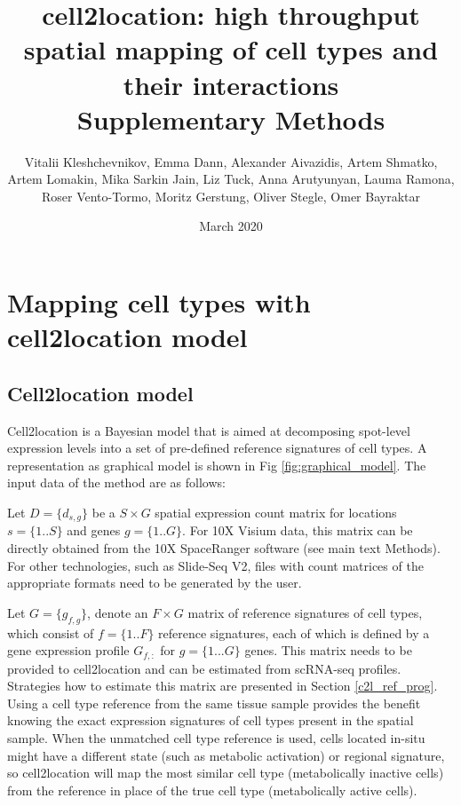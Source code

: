 \documentclass[11pt,a4paper]{article}
\title{cell2location: high throughput spatial mapping of cell types and their interactions \\
Supplementary Methods
}
\author{Vitalii Kleshchevnikov, Emma Dann, Alexander Aivazidis, Artem Shmatko, Artem Lomakin, Mika Sarkin Jain, Liz Tuck, Anna Arutyunyan, Lauma Ramona, Roser Vento-Tormo, Moritz Gerstung, Oliver Stegle, Omer Bayraktar}
\date{March 2020}
\begin{document}
\maketitle

\tableofcontents

\section{Mapping cell types with cell2location model}

\subsection{Cell2location model} \label{cell2location_model}

Cell2location is a Bayesian model that is aimed at decomposing spot-level expression levels into a set of pre-defined reference signatures of cell types. A representation as graphical model is shown in Fig \ref{fig:graphical_model}. The input data of the method are as follows: \newline

Let $D=\{d_{s,g}\}$ be a $S \times G$ spatial expression count matrix for locations $s=\{1..S\}$ and genes $g=\{1..G\}$. 
For 10X Visium data, this matrix can be directly obtained from the 10X SpaceRanger software (see main text Methods). For other technologies, such as Slide-Seq V2, files with count matrices of the appropriate formats need to be generated by the user. \newline

Let $G=\{g_{f,g}\}$, denote an $F \times G$ matrix of reference signatures of cell types, which consist of $f=\{1..F\}$ reference signatures, each of which is defined by a gene expression profile $G_{f,:}$ for $g=\{1...G\}$ genes. This matrix needs to be provided to cell2location and can be estimated from scRNA-seq profiles. Strategies how to estimate this matrix are presented in Section \ref{c2l_ref_prog}. \newline
Using a cell type reference from the same tissue sample provides the benefit knowing the exact expression signatures of cell types present in the spatial sample. When the unmatched cell type reference is used, cells located in-situ might have a different state (such as metabolic activation) or regional signature, so cell2location will map the most similar cell type (metabolically inactive cells) from the reference in place of the true cell type (metabolically active cells). \newline
\end{document}
